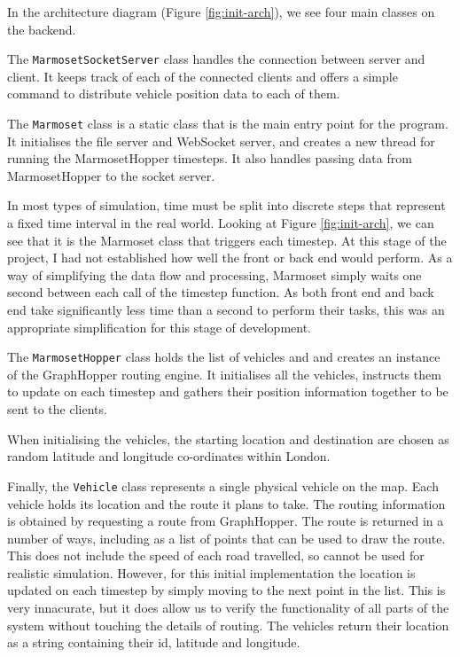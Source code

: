 \documentclass[ %
                    author={Alexander Hill},
                supervisor={Dr. Benjamin Sach},
                    degree={MEng},
                     title={MARMOSET},
                  subtitle={Multi-Agent Route Management using Online Simulation for Efficient Transportation},
                      type={research},
                      year={2016} ]{dissertation}
\begin{document}
In the architecture diagram (Figure \ref{fig:init-arch}), we see four main
classes on the backend.

The \texttt{MarmosetSocketServer} class handles the connection between server and client.
It keeps track of each of the connected clients and offers a simple command to
distribute vehicle position data to each of them.

The \texttt{Marmoset} class is a static class that is the main entry point for the
program. It initialises the file server and WebSocket server, and creates a new
thread for running the MarmosetHopper timesteps. It also handles passing data from
MarmosetHopper to the socket server.

In most types of simulation, time must be split into discrete steps that
represent a fixed time interval in the real world. Looking at Figure
\ref{fig:init-arch}, we can see that it is the Marmoset class that triggers each
timestep. At this stage of the project, I had not established how well the front
or back end would perform. As a way of simplifying the data flow and processing,
Marmoset simply waits one second between each call of the timestep function.
As both front end and back end take significantly less time than a second to
perform their tasks, this was an appropriate simplification for this stage
of development.

The \texttt{MarmosetHopper} class holds the list of vehicles and and creates an instance
of the GraphHopper routing engine. It initialises all the vehicles, instructs
them to update on each timestep and gathers their position information together
to be sent to the clients.

When initialising the vehicles, the starting location and destination are chosen
as random latitude and longitude co-ordinates within London.

Finally, the \texttt{Vehicle} class represents a single physical vehicle on the
map. Each vehicle holds its location and the route it plans to take. The routing
information is obtained by requesting a route from GraphHopper. The route is
returned in a number of ways, including as a list of points that can be used to
draw the route. This does not include the speed of each road travelled, so
cannot be used for realistic simulation. However, for this initial
implementation the location is updated on each timestep by simply moving to the
next point in the list. This is very innacurate, but it does allow us to verify
the functionality of all parts of the system without touching the details of
routing. The vehicles return their location as a string containing their id,
latitude and longitude.
\end{document}
